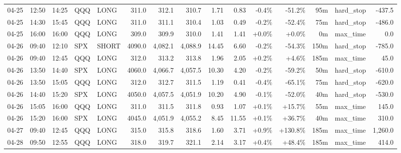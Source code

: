 \documentclass[11pt,a4paper,twoside]{article}
\begin{document}
\begin{landscape}
\begin{center}
\begin{longtable}{>{\color{txtmain}}l l l l l r r r r r r r r >{\color{txtmain}}l r}
04-25 & 12:50 & 14:25 & QQQ & LONG & 311.0 & 312.1 & 310.7 & 1.71 & 0.83 & \textcolor{lossred}{-0.4\%} & \textcolor{lossred}{-51.2\%} & 95m & hard\_stop & \textcolor{lossred}{-437.5} \\
04-25 & 14:30 & 15:45 & QQQ & LONG & 311.0 & 311.1 & 310.4 & 1.03 & 0.49 & \textcolor{lossred}{-0.2\%} & \textcolor{lossred}{-52.4\%} & 75m & hard\_stop & \textcolor{lossred}{-486.0} \\
04-25 & 16:00 & 16:00 & QQQ & LONG & 309.0 & 309.9 & 310.0 & 1.41 & 1.41 & \textcolor{wingreen}{+0.0\%} & \textcolor{wingreen}{+0.0\%} & 0m & max\_time & \textcolor{wingreen}{0.0} \\
04-26 & 09:40 & 12:10 & SPX & SHORT & 4090.0 & 4,082.1 & 4,088.9 & 14.45 & 6.60 & \textcolor{lossred}{-0.2\%} & \textcolor{lossred}{-54.3\%} & 150m & hard\_stop & \textcolor{lossred}{-785.0} \\
04-26 & 09:40 & 12:45 & QQQ & LONG & 312.0 & 313.2 & 313.8 & 1.96 & 2.05 & \textcolor{wingreen}{+0.2\%} & \textcolor{wingreen}{+4.6\%} & 185m & max\_time & \textcolor{wingreen}{45.0} \\
04-26 & 13:50 & 14:40 & SPX & LONG & 4060.0 & 4,066.7 & 4,057.5 & 10.30 & 4.20 & \textcolor{lossred}{-0.2\%} & \textcolor{lossred}{-59.2\%} & 50m & hard\_stop & \textcolor{lossred}{-610.0} \\
04-26 & 13:50 & 15:05 & QQQ & LONG & 312.0 & 312.7 & 311.5 & 1.19 & 0.41 & \textcolor{lossred}{-0.4\%} & \textcolor{lossred}{-65.1\%} & 75m & hard\_stop & \textcolor{lossred}{-620.0} \\
04-26 & 14:40 & 15:20 & SPX & LONG & 4050.0 & 4,057.5 & 4,051.9 & 10.20 & 4.90 & \textcolor{lossred}{-0.1\%} & \textcolor{lossred}{-52.0\%} & 40m & hard\_stop & \textcolor{lossred}{-530.0} \\
04-26 & 15:05 & 16:00 & QQQ & LONG & 311.0 & 311.5 & 311.8 & 0.93 & 1.07 & \textcolor{wingreen}{+0.1\%} & \textcolor{wingreen}{+15.7\%} & 55m & max\_time & \textcolor{wingreen}{145.0} \\
04-26 & 15:20 & 16:00 & SPX & LONG & 4045.0 & 4,051.9 & 4,055.2 & 8.45 & 11.55 & \textcolor{wingreen}{+0.1\%} & \textcolor{wingreen}{+36.7\%} & 40m & max\_time & \textcolor{wingreen}{310.0} \\
04-27 & 09:40 & 12:45 & QQQ & LONG & 315.0 & 315.8 & 318.6 & 1.60 & 3.71 & \textcolor{wingreen}{+0.9\%} & \textcolor{wingreen}{+130.8\%} & 185m & max\_time & \textcolor{wingreen}{1,260.0} \\
04-28 & 09:50 & 12:55 & QQQ & LONG & 318.0 & 319.7 & 321.1 & 2.14 & 3.17 & \textcolor{wingreen}{+0.4\%} & \textcolor{wingreen}{+48.4\%} & 185m & max\_time & \textcolor{wingreen}{414.0} \\

\end{longtable}
\end{center}
\end{landscape}
\end{document}
